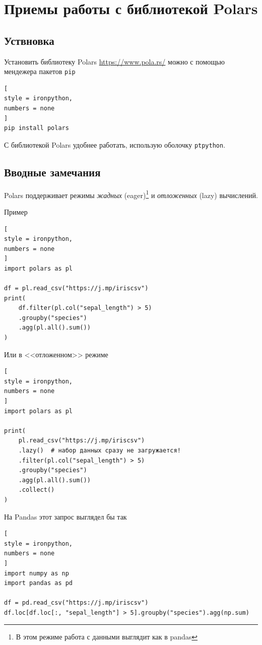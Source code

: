 \documentclass[%
	11pt,
	a4paper,
	utf8,
		]{article}
\begin{document}
\section{Приемы работы с библиотекой Polars}

\subsection{Уствновка}

Установить библиотеку Polars \url{https://www.pola.rs/} можно с помощью мендежера пакетов \texttt{pip}
\begin{lstlisting}[
style = ironpython,
numbers = none
]
pip install polars
\end{lstlisting}

С библиотекой Polars удобнее работать, использую оболочку \texttt{ptpython}.

\subsection{Вводные замечания}

Polars поддерживает режимы \emph{жадных} (eager)\footnote{В этом режиме работа с данными выглядит как в pandas} и \emph{отложенных} (lazy) вычислений.

Пример
\begin{lstlisting}[
style = ironpython,
numbers = none	
]
import polars as pl

df = pl.read_csv("https://j.mp/iriscsv")
print(
	df.filter(pl.col("sepal_length") > 5)
	.groupby("species")
	.agg(pl.all().sum())
)
\end{lstlisting}

Или в <<отложенном>> режиме
\begin{lstlisting}[
style = ironpython,
numbers = none
]
import polars as pl

print(
	pl.read_csv("https://j.mp/iriscsv")
	.lazy()  # набор данных сразу не загружается!
	.filter(pl.col("sepal_length") > 5)
	.groupby("species")
	.agg(pl.all().sum())
	.collect()
)
\end{lstlisting}

На Pandas этот запрос выглядел бы так
\begin{lstlisting}[
style = ironpython,
numbers = none
]
import numpy as np
import pandas as pd

df = pd.read_csv("https://j.mp/iriscsv")
df.loc[df.loc[:, "sepal_length"] > 5].groupby("species").agg(np.sum)
\end{lstlisting}
\end{document}
